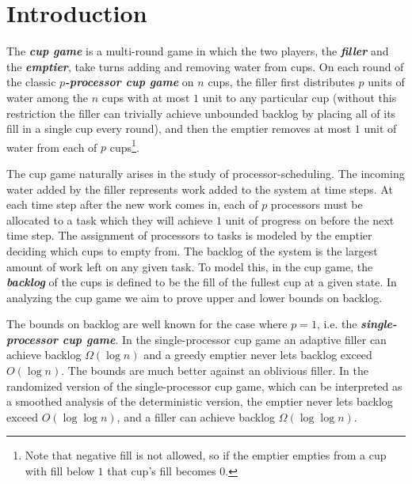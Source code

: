 \documentclass[twocolumn]{article}[10pt]
\newcommand{\defn}[1]{{\textit{\textbf{\boldmath #1}}}\xspace}
\renewcommand{\paragraph}[1]{\vspace{0.09in}\noindent{\bf \boldmath #1.}}
\begin{document}
\section{Introduction}\label{sec:intro}
\paragraph{Definition and Motivation}
The \defn{cup game} is a multi-round game in which the two players, the
\defn{filler} and the \defn{emptier}, take turns adding and removing water
from cups. On each round of the classic \defn{$p$-processor cup game} on $n$
cups, the filler first distributes $p$ units of water among
the $n$ cups with at most $1$ unit to any particular cup (without this
restriction the filler can trivially achieve unbounded backlog by placing all
of its fill in a single cup every round), and then the emptier 
removes at most $1$ unit of water from each of $p$ cups\footnote{Note that negative
fill is not allowed, so if the emptier empties from a cup with fill below $1$
that cup's fill becomes $0$.}.

The cup game naturally arises in the study of processor-scheduling.
The incoming water added by the filler represents work added to the system at
time steps. At each time step after the new work comes in, each of $p$
processors must be allocated to a task which they will achieve $1$ unit of
progress on before the next time step. The assignment of processors to tasks is
modeled by the emptier deciding which cups to empty from. The backlog of
the system is the largest amount of work left on any given task. To model this,
in the cup game, the \defn{backlog} of the cups is defined to be the fill of
the fullest cup at a given state. 
In analyzing the cup game we aim to prove upper and lower bounds on backlog.

\paragraph{Previous Work}
The bounds on backlog are well known for the case where $p=1$, i.e. the
\defn{single-processor cup game}.
In the single-processor cup game an adaptive filler can achieve backlog
$\Omega(\log n)$ and a greedy emptier never lets backlog exceed $O(\log n)$.
The bounds are much better against an oblivious filler.
In the randomized version of the single-processor cup game, which can be
interpreted as a smoothed analysis of the deterministic version, the emptier
never lets backlog exceed $O(\log \log n)$, and a filler can achieve backlog
$\Omega(\log\log n)$.
\end{document}
